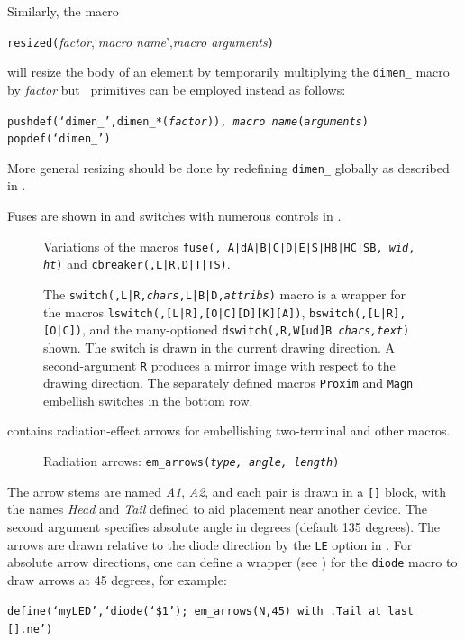 Similarly, the macro
\par
{\tt resized(}{\sl factor},`{\sl macro name}',{\sl macro arguments}{\tt )}
\par
\noindent
will resize the body of an element by temporarily multiplying
the {\tt dimen\_} macro by {\sl factor} but
\Mfour\ primitives can be employed instead as follows:
\par
{\tt pushdef(`dimen\_',dimen\_*({\sl factor})),%
{\sl macro name}({\sl arguments}) popdef(`dimen\_')}
\par
\noindent
More general resizing should be
done by redefining {\tt dimen\_} globally as described in .

Fuses are shown in 
and switches with numerous controls in .
\begin{figure}[h!t]
   
   \caption{Variations of the macros
     {\tt fuse(\linespec, A|dA|B|C|D|E|S|HB|HC|SB, {\sl wid}, {\sl ht})}
     and {\tt cbreaker(\linespec,L|R,D|T|TS)}.}
   \label{Fuses}
   \end{figure}

\begin{figure}[h!t]
   
   \caption{The
     {\tt switch(\linespec,L|R,{\sl chars},L|B|D,{\sl attribs})}
     macro is a wrapper for the macros 
     {\tt lswitch(\linespec,[L|R],[O|C][D][K][A])},
     {\tt bswitch(\linespec,[L|R],[O|C])},
     and the many-optioned
     {\tt dswitch(\linespec,R,W[ud]B {\sl chars,text})} shown.
     The switch is drawn in the current drawing direction.
     A second-argument {\tt R} produces a mirror
     image with respect to the drawing direction.
     The separately defined macros {\tt Proxim} and {\tt Magn}
     embellish switches in the bottom row.}
   \label{Switches}
   \end{figure}

\pagebreak
{} contains radiation-effect arrows for embellishing two-terminal
and other macros.
\begin{figure}[h!t]
   
   \caption{Radiation arrows: {\tt em\_arrows({\sl type, angle, length})}}
   \label{Emarrows}
   \end{figure}
The arrow stems are named {\sl A1}, {\sl A2},
and each pair is drawn in a \verb|[]| block, with
the names {\sl Head} and {\sl Tail} defined to
aid placement near another device.  The second argument specifies
absolute angle in degrees (default 135 degrees).
The arrows are drawn relative to the diode direction by the {\tt LE}
option in .  For absolute arrow directions, one can
define a wrapper (see ) for the {\tt diode} macro to draw arrows
at 45 degrees, for example:
\par
{\tt define(`myLED',`diode(`\$1'); em\_arrows(N,45)
 with .Tail at last [].ne')}

